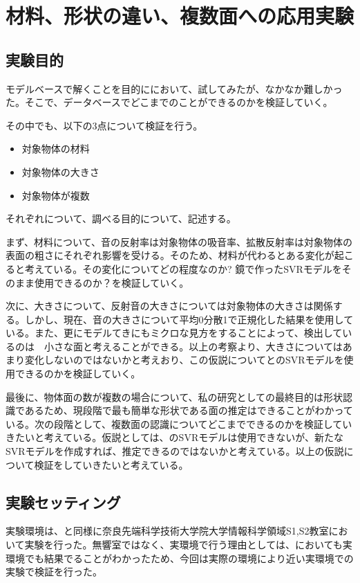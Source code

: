 \section{材料、形状の違い、複数面への応用実験}
\label{chap:application_experiment}
\subsection{実験目的}
\label{sec:app_exp_purpos}
モデルベースで解くことを目的ににおいて、試してみたが、なかなか難しかった。そこで、データベースでどこまでのことができるのかを検証していく。

その中でも、以下の3点について検証を行う。
\begin{itemize}
    \item 対象物体の材料
    \item 対象物体の大きさ
    \item 対象物体が複数
\end{itemize}

それぞれについて、調べる目的について、記述する。

まず、材料について、音の反射率は対象物体の吸音率、拡散反射率は対象物体の表面の粗さにそれぞれ影響を受ける。そのため、材料が代わるとある変化が起こると考えている。その変化についてどの程度なのか?
鏡で作ったSVRモデルをそのまま使用できるのか？を検証していく。

次に、大きさについて、反射音の大きさについては対象物体の大きさは関係する。しかし、現在、音の大きさについて平均0分散1で正規化した結果を使用している。また、更にモデルてきにもミクロな見方をすることによって、検出しているのは　小さな面と考えることができる。以上の考察より、大きさについてはあまり変化しないのではないかと考えおり、この仮説についてとのSVRモデルを使用できるのかを検証していく。

最後に、物体面の数が複数の場合について、私の研究としての最終目的は形状認識であるため、現段階で最も簡単な形状である面の推定はできることがわかっている。次の段階として、複数面の認識についてどこまでできるのかを検証していきたいと考えている。仮説としては、のSVRモデルは使用できないが、新たなSVRモデルを作成すれば、推定できるのではないかと考えている。以上の仮説について検証をしていきたいと考えている。

\subsection{実験セッティング}
\label{sec:app_exp_setting}
実験環境は、と同様に奈良先端科学技術大学院大学情報科学領域S1,S2教室において実験を行った。無響室ではなく、実環境で行う理由としては、においても実環境でも結果でることがわかったため、今回は実際の環境により近い実環境での実験で検証を行った。

